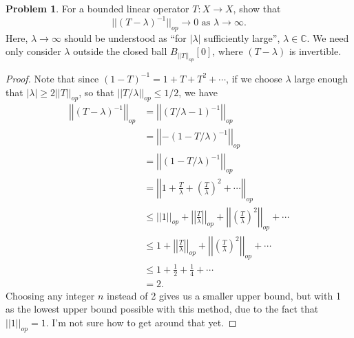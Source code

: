 \documentclass[12pt]{article}
\theoremstyle{definition}
\newtheorem{ex}{Problem}
\begin{document}
\begin{ex}
	For a bounded linear operator $T : X \to X$, show that \begin{equation*}
		||(T-\lambda)^{-1}||_{op} \to 0 \text{ as } \lambda \to \infty.
	\end{equation*}
	Here, $\lambda \to \infty$ should be understood as ``for $|\lambda|$ sufficiently large'', $\lambda \in \mathbb{C}$.
	We need only consider $\lambda$ outside the closed ball $B_{||T||_{op}}[0]$, where $(T - \lambda)$ is invertible.
\end{ex}
\begin{proof}
	Note that since $(1-T)^{-1} = 1 + T + T^2 + \cdots$, if we choose $\lambda$ large enough that $|\lambda| \geq 2 ||T||_{op}$, so that $||T/\lambda||_{op} \leq 1/2$, we have \begin{align*}
    \left|\left|(T - \lambda)^{-1}\right|\right|_{op} & = \left|\left|(T/\lambda - 1)^{-1}\right|\right|_{op}                                                              \\
                                   & = \left|\left| -(1 - T/\lambda)^{-1}\right|\right|_{op}                                                             \\
                                   & = \left|\left| (1 - T/\lambda)^{-1}\right|\right|_{op}                                                             \\
                                   & = \left|\left| 1 + \frac{T}{\lambda} + \left(\frac{T}{\lambda}\right)^2 + \cdots \right|\right|_{op} \\
                                   & \leq \left|\left| 1 \right|\right|_{op} + \left|\left|\frac{T}{\lambda}\right|\right|_{op} + \left|\left|\left(\frac{T}{\lambda}\right)^2\right|\right|_{op} + \cdots \\
                                   & \leq 1 + \left|\left|\frac{T}{\lambda}\right|\right|_{op}  + \left|\left|\left(\frac{T}{\lambda}\right)^2\right|\right|_{op} + \cdots \\
                                   & \leq 1 + \frac{1}{2} + \frac{1}{4} + \cdots \\
                                   & = 2.
	\end{align*}
  Choosing any integer $n$ instead of 2 gives us a smaller upper bound, but with 1 as the lowest upper bound possible with this method, due to the fact that $||1||_{op} = 1$.
  I'm not sure how to get around that yet.
\end{proof}
\end{document}
